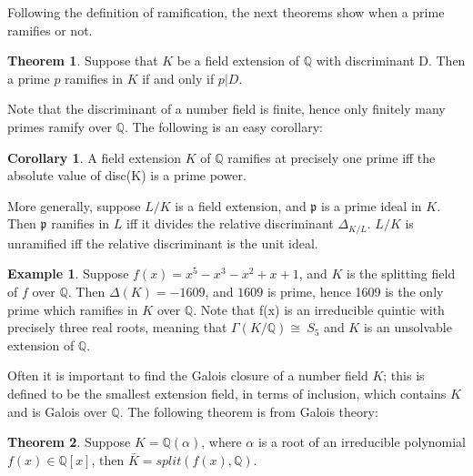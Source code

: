 \documentclass[12pt]{extarticle}
\newcommand{\Q}{\mathbb{Q}}
\newcommand{\GG}{\Gamma(K/\mathbb{Q})}
\newcommand{\spl}{split(f(x),\mathbb{Q})}
\newcommand{\<}{\langle}
\renewcommand{\>}{\rangle}
\theoremstyle{definition}
\newtheorem{theorem}{Theorem}
\newtheorem{corollary}{Corollary}
\newtheorem*{example}{Example}
\begin{document}
Following the definition of ramification, the next theorems show when a prime ramifies or not. 
\begin{theorem}
 Suppose that $K$ be a field extension of $\Q$ with discriminant D. Then a prime $p$
ramifies in $K$ if and only if $p|D$.   
\end{theorem}
Note that the discriminant of a number field is finite, hence only finitely many primes ramify over $\Q$. The following is an easy corollary:
\begin{corollary}
A field extension $K$ of $\Q$ ramifies at precisely one prime iff the absolute value of disc(K) is a prime power.
\end{corollary}
More generally, suppose $L/K$ is a field extension, and $\mathfrak{p}$ is a prime ideal in $K$. Then $\mathfrak{p}$ ramifies in $L$ iff it divides the relative discriminant $\Delta_{K/L}$. $L/K$ is unramified iff the relative discriminant is the unit ideal. 
\begin{example}
    Suppose $f(x)=  x^5 - x^3 - x^2 + x + 1$, and $K$ is the splitting field of $f$ over $\Q$. Then $\Delta(K)=-1609$, and $1609$ is prime, hence 1609 is the only prime which ramifies in $K$ over $\Q$. Note that f(x) is an irreducible quintic with precisely three real roots, meaning that $\GG \cong\ S_5$ and $K$ is an unsolvable extension of $\Q$.
\end{example}


Often it is important to find the Galois closure of a number field $K$;  this is defined to be the smallest extension field, in terms of inclusion, which contains $K$ and is Galois over $\Q$. The following theorem is from Galois theory:
 \begin{theorem}
  Suppose $K=\Q(\alpha)$, where $\alpha$ is a root of an irreducible polynomial $f(x) \in \Q[x]$, then $\bar{K} = \spl$.
\end{theorem}
\end{document}
